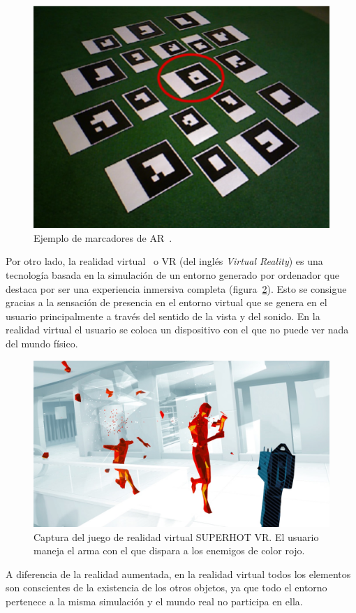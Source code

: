 \begin{figure}[H]
    \centering
    \includegraphics[scale=0.25]{Images/Estado del arte/armarkers.png}
    \caption{Ejemplo de marcadores de AR~\cite{arMarkerArticle}.}
    \label{fig:armaerkersexample}
\end{figure}

Por otro lado, la realidad virtual~\cite{vrintroduction} o VR (del inglés \textit{Virtual Reality}) es una tecnología basada en la simulación de un entorno generado por ordenador que destaca por ser una experiencia inmersiva completa (figura~\ref{fig:superhotVR}). Esto se consigue gracias a la sensación de presencia en el entorno virtual que se genera en el usuario principalmente a través del sentido de la vista y del sonido. En la realidad virtual el usuario se coloca un dispositivo con el que no puede ver nada del mundo físico.

\begin{figure}[H]
    \centering
    \includegraphics[scale=0.25]{Images/Estado del arte/superhotvr.jpg}
    \caption[Captura del juego de realidad virtual SUPERHOT VR.]{Captura del juego de realidad virtual SUPERHOT VR\footnotemark. El usuario maneja el arma con el que dispara a los enemigos de color rojo.}
    \label{fig:superhotVR}
\end{figure}
A diferencia de la realidad aumentada, en la realidad virtual todos los elementos son conscientes de la existencia de los otros objetos, ya que todo el entorno pertenece a la misma simulación y el mundo real no participa en ella.\\

